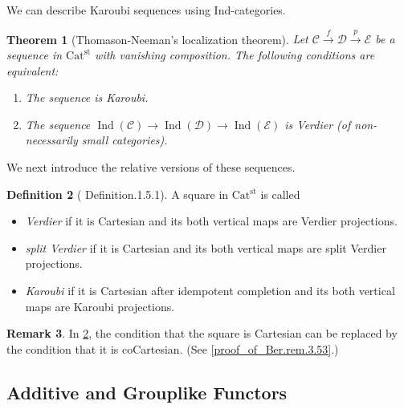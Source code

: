 \documentclass[a4paper,dvipdfmx,11pt,reqno]{amsart}
\newcommand{\C}{\mathcal{C}}
\newcommand{\D}{\mathcal{D}}
\newcommand{\E}{\mathcal{E}}
\DeclareMathOperator{\Ind}{Ind}
\newcommand{\Catst}{\mathrm{Cat^{st}}}
\newtheorem{theorem}{Theorem}[section]
\theoremstyle{definition}
\newtheorem{definition}[theorem]{Definition}
\newtheorem{remark}[theorem]{Remark}
\begin{document}
We can describe Karoubi sequences using Ind-categories. 

\begin{theorem}[Thomason-Neeman's localization theorem] \label{Ber.thrm.3.47}
  Let $\C \xrightarrow{f} \D \xrightarrow{p} \E$ be a sequence in $\Catst$ with vanishing composition.
  The following conditions are equivalent:
  \begin{enumerate}
    \item The sequence is Karoubi.
    \item The sequence $\Ind(\C) \to \Ind(\D) \to \Ind(\E)$ is Verdier (of non-necessarily small categories).
  \end{enumerate}
\end{theorem}

We next introduce the relative versions of these sequences.

\begin{definition}[\cite{CDH23} Definition.1.5.1] \label{CDH23.def.1.5.1}
  A square in $\Catst$ is called
  \begin{itemize}
    \item \textit{Verdier} if it is Cartesian and its both vertical maps are Verdier projections.
    \item \textit{split Verdier} if it is Cartesian and its both vertical maps are split Verdier projections.
    \item \textit{Karoubi} if it is Cartesian after idempotent completion and its both vertical maps are Karoubi projections.
  \end{itemize}
\end{definition}

\begin{remark} \label{Ber.rem.3.53}
  In \cref{CDH23.def.1.5.1}, the condition that the square is Cartesian can be replaced by the condition that it is coCartesian.
  (See \cref{proof_of_Ber.rem.3.53}.)
\end{remark}


\subsection{Additive and Grouplike Functors}
\end{document}
